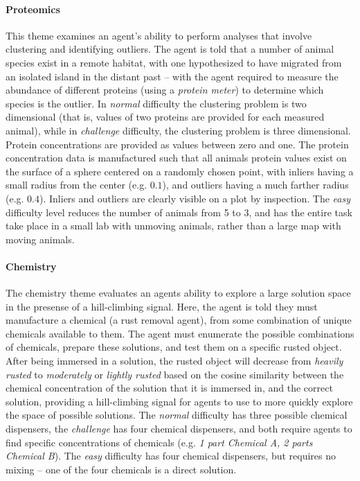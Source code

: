 \documentclass{article}
\begin{document}
\paragraph{Proteomics} This theme examines an agent's ability to perform analyses that involve clustering and identifying outliers.  The agent is told that a number of animal species exist in a remote habitat, with one hypothesized to have migrated from an isolated island in the distant past -- with the agent required to measure the abundance of different proteins (using a \textit{protein meter}) to determine which species is the outlier.  In \textit{normal} difficulty the clustering problem is two dimensional (that is, values of two proteins are provided for each measured animal), while in \textit{challenge} difficulty, the clustering problem is three dimensional. Protein concentrations are provided as values between zero and one. The protein concentration data is manufactured such that all animals protein values exist on the surface of a sphere centered on a randomly chosen point, with inliers having a small radius from the center (e.g. $0.1$), and outliers having a much farther radius (e.g. $0.4$).  Inliers and outliers are clearly visible on a plot by inspection.  The \textit{easy} difficulty level reduces the number of animals from 5 to 3, and has the entire task take place in a small lab with unmoving animals, rather than a large map with moving animals.

\paragraph{Chemistry} The chemistry theme evaluates an agents ability to explore a large solution space in the presense of a hill-climbing signal.  Here, the agent is told they must manufacture a chemical (a rust removal agent), from some combination of unique chemicals available to them.  The agent must enumerate the possible combinations of chemicals, prepare these solutions, and test them on a specific rusted object.  After being immersed in a solution, the rusted object will decrease from \textit{heavily rusted} to \textit{moderately} or \textit{lightly rusted} based on the cosine similarity between the chemical concentration of the solution that it is immersed in, and the correct solution, providing a hill-climbing signal for agents to use to more quickly explore the space of possible solutions.  The \textit{normal} difficulty has three possible chemical dispensers, the \textit{challenge} has four chemical dispensers, and both require agents to find specific concentrations of chemicals (e.g. \textit{1 part Chemical A, 2 parts Chemical B}).  The \textit{easy} difficulty has four chemical dispensers, but requires no mixing -- one of the four chemicals is a direct solution.
\end{document}

